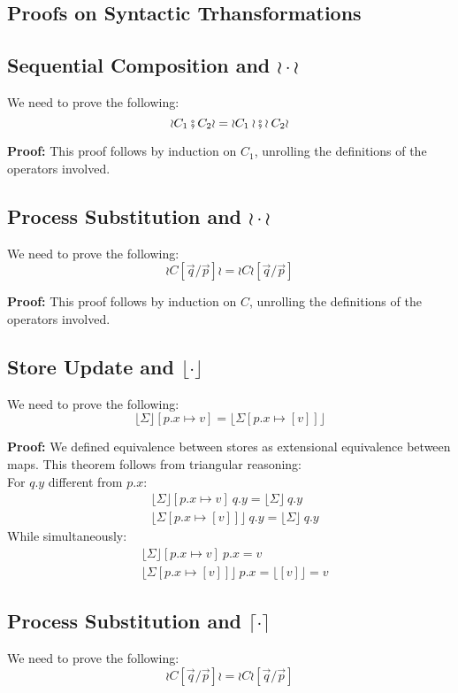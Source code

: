 \documentclass[12pt,a4paper,twoside]{book}
\begin{document}
\begin{appendices}
\chapter{Proofs on Syntactic Trhansformations}
\label{appdix:A}
\section{Sequential Composition and $\wr \cdot \wr$}
We need to prove the following:
$$\wr C_1 \fatsemi C_2 \wr = \wr C_1 \wr \fatsemi \wr C_2 \wr$$

\noindent\textbf{Proof:}
This proof follows by induction on $C_1$, unrolling the definitions of the operators involved.

\section{Process Substitution and $\wr \cdot \wr$}
We need to prove the following:
$$\wr C [\vec{q}/\vec{p}] \wr = \wr C \wr [\vec{q}/\vec{p}]$$

\noindent\textbf{Proof:}
This proof follows by induction on $C$, unrolling the definitions of the operators involved.

\section{Store Update and $\lfloor \cdot \rfloor$}
We need to prove the following:
$$\lfloor \Sigma \rfloor[p.x \mapsto v] = \lfloor \Sigma[p.x \mapsto [v]] \rfloor$$

\noindent\textbf{Proof:}
We defined equivalence between stores as extensional equivalence between maps.
This theorem follows from triangular reasoning:\\
For $q.y$ different from $p.x$:
\begin{align*}
&\lfloor \Sigma \rfloor[p.x \mapsto v]~q.y = \lfloor \Sigma \rfloor~q.y\\
&\lfloor \Sigma [p.x \mapsto [v]] \rfloor~q.y = \lfloor \Sigma \rfloor~q.y
\end{align*}
While simultaneously:
\begin{align*}
&\lfloor \Sigma \rfloor[p.x \mapsto v]~p.x = v\\
&\lfloor \Sigma [p.x \mapsto [v]] \rfloor~p.x = \lfloor [v] \rfloor = v
\end{align*}


\section{Process Substitution and $\lceil \cdot \rceil$}
We need to prove the following:
$$\wr C [\vec{q}/\vec{p}] \wr = \wr C \wr [\vec{q}/\vec{p}]$$


\end{appendices}
\end{document}
